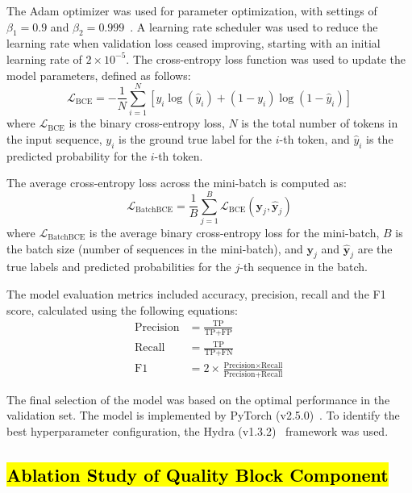 \documentclass[pdflatex,sn-nature, lineno]{sn-jnl}%
\begin{document}
The Adam optimizer was used for parameter optimization, with settings of \(\beta_{1} = 0.9 \) and \(\beta_{2} = 0.999 \)~\cite{kingma2014adam}.
A learning rate scheduler was used to reduce the learning rate when validation loss ceased improving, starting with an initial learning rate of \(2 \times 10^{-5} \).
The cross-entropy loss function was used to update the model parameters, defined as follows:
\[
	\mathcal{L}_{\textrm{BCE}} = -\frac{1}{N} \sum_{i=1}^{N} [y_i \log(\hat{y}_i) + (1 - y_i) \log(1 - \hat{y}_i)]
\]
where \(\mathcal{L}_{\textrm{BCE}}\) is the binary cross-entropy loss, \(N\) is the total number of tokens in the input sequence, \(y_i\) is the ground true label for the \(i\)-th token, and \(\hat{y}_i\) is the predicted probability for the \(i\)-th token.

The average cross-entropy loss across the mini-batch is computed as:
\[
	\mathcal{L}_{\textrm{BatchBCE}} = \frac{1}{B} \sum_{j=1}^{B} \mathcal{L}_{\textrm{BCE}}(\mathbf{y}_j, \hat{\mathbf{y}}_j)
\]
where \(\mathcal{L}_{\textrm{BatchBCE}}\) is the average binary cross-entropy loss for the mini-batch, \(B\) is the batch size (number of sequences in the mini-batch),  and \(\mathbf{y}_j\) and \(\hat{\mathbf{y}}_j\) are the true labels and predicted probabilities for the \(j\)-th sequence in the batch.

The model evaluation metrics included accuracy, precision, recall and the F1 score, calculated using the following equations:
\begin{align*}
	\textrm{Precision} & = \frac{\textrm{TP}}{\textrm{TP}+\textrm{FP}}                                                     \\
	\textrm{Recall}    & = \frac{\textrm{TP}}{\textrm{TP}+\textrm{FN}}                                                     \\
	\textrm{F1}        & = 2 \times \frac{\textrm{Precision} \times \textrm{Recall}}{\textrm{Precision} + \textrm{Recall}}
\end{align*}

The final selection of the model was based on the optimal performance in the validation set.
The model is implemented by PyTorch (v2.5.0)~\cite{paszke2019pytorch}.
To identify the best hyperparameter configuration, the Hydra (v1.3.2)~\cite{Yadan2019Hydra} framework was used.

\subsection{\hl{Ablation Study of Quality Block Component}}
    
\end{document}
